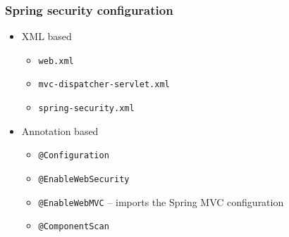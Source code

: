 \documentclass[10pt,xcolor=pdflatex, table]{beamer}
\begin{document}
\begin{frame}\frametitle{Spring security configuration}
	\begin{itemize}
		\item XML based
        \begin{itemize}
        	\item \texttt{web.xml}
        	\item \texttt{mvc-dispatcher-servlet.xml}
        	\item \texttt{spring-security.xml}
        \end{itemize}
		\item Annotation based
        \begin{itemize}
       	 	\item \texttt{@Configuration}
       	 	\item \texttt{@EnableWebSecurity}
       	 	\item \texttt{@EnableWebMVC} {\footnotesize -- imports the Spring MVC configuration}
       	 	\item \texttt{@ComponentScan}
        \end{itemize}
	\end{itemize}
\end{frame}
\end{document}
